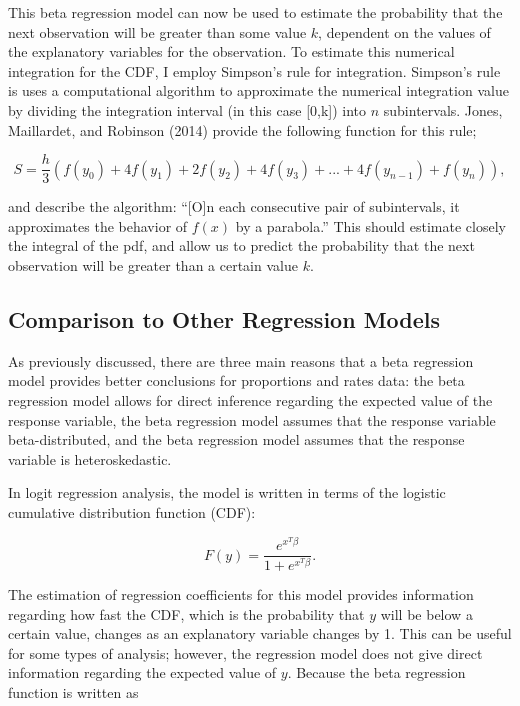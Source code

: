 \documentclass{svproc}
\begin{document}
This beta regression model can now be used to estimate the probability that the next observation will be greater than some value $k$, dependent on the values of the explanatory variables for the observation. To estimate this numerical integration for the CDF, I employ Simpson's rule for integration. Simpson's rule is uses a computational algorithm to approximate the numerical integration value by dividing the integration interval (in this case [0,k]) into $n$ subintervals. Jones, Maillardet, and Robinson (2014) provide the following function for this rule;

\begin{equation}
S = \frac{h}{3} (f(y_0) + 4f(y_1) + 2f(y_2) + 4f(y_3) + ... + 4f(y_{n-1}) + f(y_n)) ,
\end{equation}

and describe the algorithm: \enquote{[O]n each consecutive pair of subintervals, it approximates the behavior of $f(x)$ by a parabola.} This should estimate closely the integral of the pdf, and allow us to predict the probability that the next observation will be greater than a certain value $k$.

\subsection{Comparison to Other Regression Models}

As previously discussed, there are three main reasons that a beta regression model provides better conclusions for proportions and rates data: the beta regression model allows for direct inference regarding the expected value of the response variable, the beta regression model assumes that the response variable beta-distributed, and the beta regression model assumes that the response variable is heteroskedastic. 

In logit regression analysis, the model is written in terms of the logistic cumulative distribution function (CDF):

\begin{equation}
F(y) = \frac{e^{x^T \beta}}{1+e^{x^T \beta}} .
\end{equation}

The estimation of regression coefficients for this model provides information regarding how fast the CDF, which is the probability that $y$ will be below a certain value, changes as an explanatory variable changes by 1. This can be useful for some types of analysis; however, the regression model does not give direct information regarding the expected value of $y$. Because the beta regression function is written as
\end{document}
